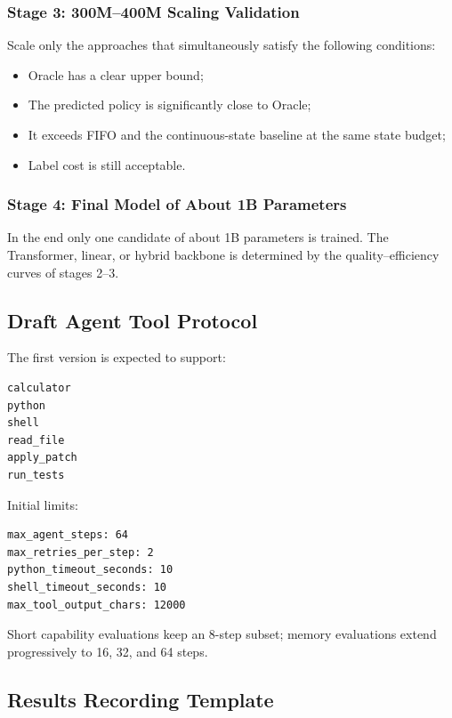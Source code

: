 \subsubsection{Stage 3: 300M--400M Scaling Validation}

Scale only the approaches that simultaneously satisfy the following conditions:

\begin{itemize}
  \item Oracle has a clear upper bound;
  \item The predicted policy is significantly close to Oracle;
  \item It exceeds FIFO and the continuous-state baseline at the same state budget;
  \item Label cost is still acceptable.
\end{itemize}

\subsubsection{Stage 4: Final Model of About 1B Parameters}

In the end only one candidate of about 1B parameters is trained. The Transformer, linear, or hybrid backbone is determined by the quality--efficiency curves of stages 2--3.

\subsection{Draft Agent Tool Protocol}

The first version is expected to support:

\begin{lstlisting}[style=notes]
calculator
python
shell
read_file
apply_patch
run_tests
\end{lstlisting}

Initial limits:

\begin{lstlisting}[style=notes]
max_agent_steps: 64
max_retries_per_step: 2
python_timeout_seconds: 10
shell_timeout_seconds: 10
max_tool_output_chars: 12000
\end{lstlisting}

Short capability evaluations keep an 8-step subset; memory evaluations extend progressively to 16, 32, and 64 steps.

\subsection{Results Recording Template}

